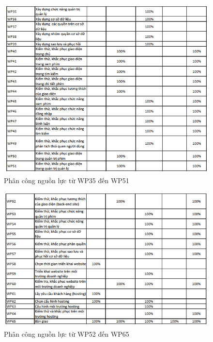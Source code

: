 \documentclass[a4paper]{book}
\begin{document}
\begin{figure}[h!]
	\centering
	\includegraphics[width=0.7\textheight]{RP_35_51.png}
	\caption{Phân công nguồn lực từ WP35 đến WP51}
	\label{fig:RP_35_51}
\end{figure}
\begin{figure}[h!]
	\centering
	\includegraphics[width=0.7\textheight]{RP_52_65.png}
	\caption{Phân công nguồn lực từ WP52 đến WP65}
	\label{fig:RP_52_65}
\end{figure}
\newpage
\listoftables
\listoffigures
\end{document}
